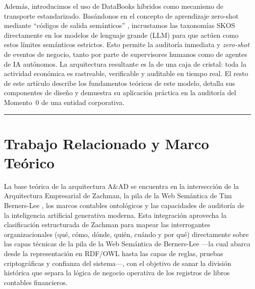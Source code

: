 \documentclass[12pt, a4paper]{article}
\begin{document}
Además, introducimos el uso de DataBooks híbridos \cite{cagle2026} como mecanismo de transporte estandarizado. Basándonos en el concepto de aprendizaje zero-shot mediante ``códigos de salida semánticos'' \cite{palatucci2009}, incrustamos las taxonomías SKOS \cite{w3cskos} directamente en los modelos de lenguaje grande (LLM) para que actúen como estos límites semánticos estrictos. Esto permite la auditoría inmediata y \textit{zero-shot} de eventos de negocio, tanto por parte de supervisores humanos como de agentes de IA autónomos. La arquitectura resultante es la de una caja de cristal: toda la actividad económica es rastreable, verificable y auditable en tiempo real. El resto de este artículo describe los fundamentos teóricos de este modelo, detalla sus componentes de diseño y demuestra su aplicación práctica en la auditoría del Momento~0 de una entidad corporativa.

\hrule
\vspace{1em}

\section{Trabajo Relacionado y Marco Teórico}

La base teórica de la arquitectura A\&AD se encuentra en la intersección de la Arquitectura Empresarial de Zachman, la pila de la Web Semántica de Tim Berners-Lee \cite{bernerslee2001}, los marcos contables ontológicos y las capacidades de auditoría de la inteligencia artificial generativa moderna. Esta integración aprovecha la clasificación estructurada de Zachman para mapear las interrogantes organizacionales (qué, cómo, dónde, quién, cuándo y por qué) directamente sobre las capas técnicas de la pila de la Web Semántica de Berners-Lee ---la cual abarca desde la representación en RDF/OWL hasta las capas de reglas, pruebas criptográficas y confianza del sistema---, con el objetivo de sanar la división histórica que separa la lógica de negocio operativa de los registros de libros contables financieros.
\end{document}
